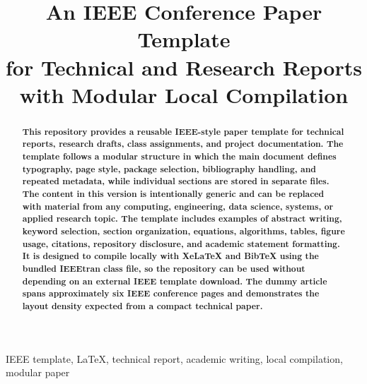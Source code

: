 \documentclass[conference]{IEEEtran}
\begin{document}

\title{An IEEE Conference Paper Template\\
for Technical and Research Reports\\
with Modular Local Compilation}

\author{
}

\maketitle
\thispagestyle{empty}
\vspace{0.5em}

\begin{abstract}
\textbf{This repository provides a reusable IEEE-style paper template for technical reports, research drafts, class assignments, and project documentation. The template follows a modular structure in which the main document defines typography, page style, package selection, bibliography handling, and repeated metadata, while individual sections are stored in separate files. The content in this version is intentionally generic and can be replaced with material from any computing, engineering, data science, systems, or applied research topic. The template includes examples of abstract writing, keyword selection, section organization, equations, algorithms, tables, figure usage, citations, repository disclosure, and academic statement formatting. It is designed to compile locally with XeLaTeX and BibTeX using the bundled IEEEtran class file, so the repository can be used without depending on an external IEEE template download. The dummy article spans approximately six IEEE conference pages and demonstrates the layout density expected from a compact technical paper.}
\end{abstract}

\begin{IEEEkeywords}
IEEE template, LaTeX, technical report, academic writing, local compilation, modular paper
\end{IEEEkeywords}

















\end{document}
